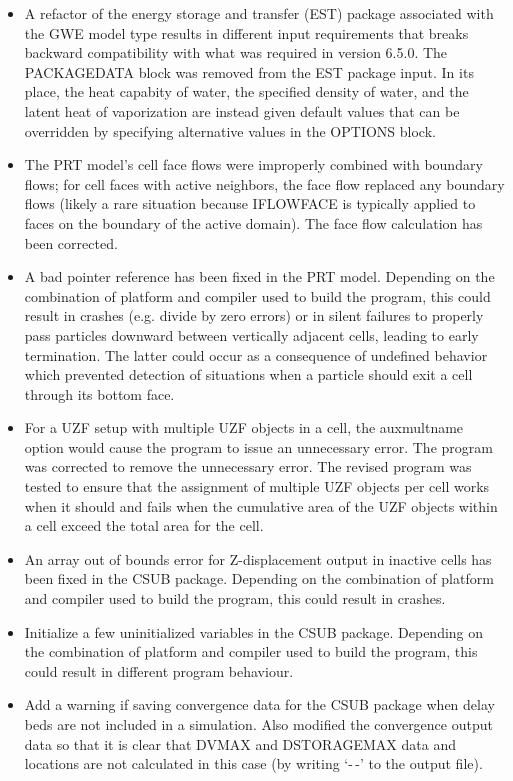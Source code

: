 \begin{itemize}
		\item A refactor of the energy storage and transfer (EST) package associated with the GWE model type results in different input requirements that breaks backward compatibility with what was required in version 6.5.0.  The PACKAGEDATA block was removed from the EST package input.  In its place, the heat capabity of water, the specified density of water, and the latent heat of vaporization are instead given default values that can be overridden by specifying alternative values in the OPTIONS block.
		\item The PRT model's cell face flows were improperly combined with boundary flows; for cell faces with active neighbors, the face flow replaced any boundary flows (likely a rare situation because IFLOWFACE is typically applied to faces on the boundary of the active domain). The face flow calculation has been corrected.
		\item A bad pointer reference has been fixed in the PRT model. Depending on the combination of platform and compiler used to build the program, this could result in crashes (e.g. divide by zero errors) or in silent failures to properly pass particles downward between vertically adjacent cells, leading to early termination. The latter could occur as a consequence of undefined behavior which prevented detection of situations when a particle should exit a cell through its bottom face.
		\item For a UZF setup with multiple UZF objects in a cell, the auxmultname option would cause the program to issue an unnecessary error.  The program was corrected to remove the unnecessary error.  The revised program was tested to ensure that the assignment of multiple UZF objects per cell works when it should and fails when the cumulative area of the UZF objects within a cell exceed the total area for the cell.
		\item An array out of bounds error for Z-displacement output in inactive cells has been fixed in the CSUB package. Depending on the combination of platform and compiler used to build the program, this could result in crashes.
		\item Initialize a few uninitialized variables in the CSUB package. Depending on the combination of platform and compiler used to build the program, this could result in different program behaviour.
		\item Add a warning if saving convergence data for the CSUB package when delay beds are not included in a simulation. Also modified the convergence output data so that it is clear that DVMAX and DSTORAGEMAX data and locations are not calculated in this case (by writing `-\,-' to the output file). 

\end{itemize}
